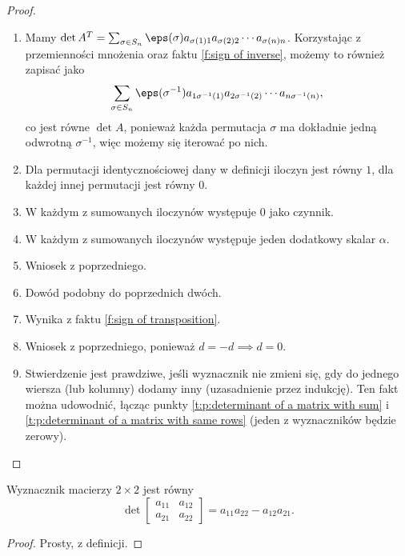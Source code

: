 \begin{proof} ~
    \begin{enumerate}
        \item Mamy $\det A^T = \sum_{\sigma \in S_n} \eps(\sigma) a_{\sigma(1)1} a_{\sigma(2)2} \cdots a_{\sigma(n)n}$. Korzystając z przemienności mnożenia oraz faktu \ref{f:sign of inverse}, możemy to również zapisać jako
        \[ \sum_{\sigma \in S_n} \eps(\sigma^{-1}) a_{1\sigma^{-1}(1)} a_{2\sigma^{-1}(2)} \cdots a_{n\sigma^{-1}(n)}, \]
        co jest równe $\det A$, ponieważ każda permutacja $\sigma$ ma dokładnie jedną odwrotną $\sigma^{-1}$, więc możemy się iterować po nich.
        \item Dla permutacji identycznościowej dany w definicji iloczyn jest równy $1$, dla każdej innej permutacji jest równy $0$.
        \item W każdym z sumowanych iloczynów występuje $0$ jako czynnik.
        \item W każdym z sumowanych iloczynów występuje jeden dodatkowy skalar $\alpha$.
        \item Wniosek z poprzedniego.
        \item Dowód podobny do poprzednich dwóch.
        \item Wynika z faktu \ref{f:sign of transposition}.
        \item Wniosek z poprzedniego, ponieważ $d = -d \implies d = 0$.
        \item Stwierdzenie jest prawdziwe, jeśli wyznacznik nie zmieni się, gdy do jednego wiersza (lub kolumny) dodamy inny (uzasadnienie przez indukcję). Ten fakt można udowodnić, łącząc punkty \ref{t:p:determinant of a matrix with sum} i \ref{t:p:determinant of a matrix with same rows} (jeden z wyznaczników będzie zerowy).
    \end{enumerate}
\end{proof}

\begin{theorem}
    Wyznacznik macierzy $2 \times 2$ jest równy
    \[ \det\begin{bmatrix}
        a_{11} & a_{12} \\
        a_{21} & a_{22}
    \end{bmatrix} = a_{11}a_{22} - a_{12}a_{21}. \]
\end{theorem}
\begin{proof}
    Prosty, z definicji.
\end{proof}


